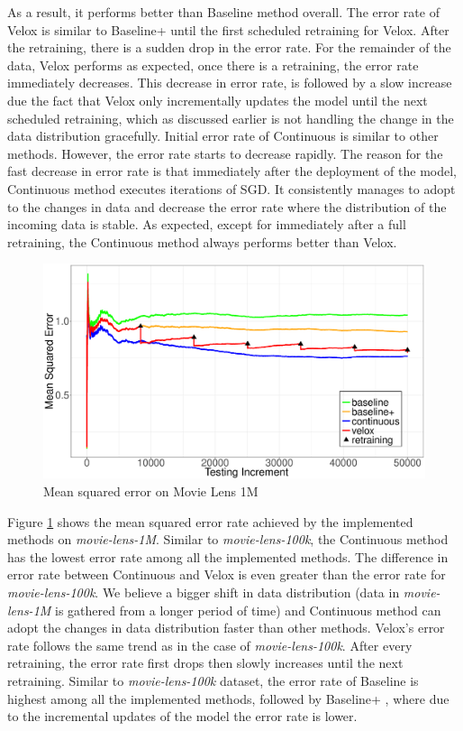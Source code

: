 \documentclass{vldb}
\begin{document}
As a result, it performs better than Baseline method overall.
The error rate of Velox is similar to Baseline+ until the first scheduled retraining for Velox.
After the retraining, there is a sudden drop in the error rate.
For the remainder of the data, Velox performs as expected, once there is a retraining, the error rate immediately decreases.
This decrease in error rate, is followed by a slow increase due the fact that Velox only incrementally updates the model until the next scheduled retraining, which as discussed earlier is not handling the change in the data distribution gracefully.
Initial error rate of Continuous is similar to other methods.
However, the error rate starts to decrease rapidly.
The reason for the fast decrease in error rate is that immediately after the deployment of the model, Continuous method executes iterations of SGD.
It consistently manages to adopt to the changes in data and decrease the error rate where the distribution of the incoming data is stable.
As expected, except for immediately after a full retraining, the Continuous method always performs better than Velox.


\begin{figure}[h]
\centering
\includegraphics[width=\columnwidth]{../images/experiment-results/movie-lens-1m-quality-improved.eps}
\caption{Mean squared error on Movie Lens 1M}
\label{fig:movie-lens-1M-score}
\end{figure}

Figure \ref{fig:movie-lens-1M-score} shows the mean squared error rate achieved by the implemented methods on \textit{movie-lens-1M}.
Similar to \textit{movie-lens-100k}, the Continuous method has the lowest error rate among all the implemented methods.
The difference in error rate between Continuous and Velox is even greater than the error rate for \textit{movie-lens-100k}.
We believe a bigger shift in data distribution (data in \textit{movie-lens-1M} is gathered from a longer period of time) and Continuous method can adopt the changes in data distribution faster than other methods.
Velox's error rate follows the same trend as in the case of \textit{movie-lens-100k}. 
After every retraining, the error rate first drops then slowly increases until the next retraining.
Similar to \textit{movie-lens-100k} dataset, the error rate of Baseline is highest among all the implemented methods, followed by Baseline+ , where due to the incremental updates of the model the error rate is lower.
\end{document}
